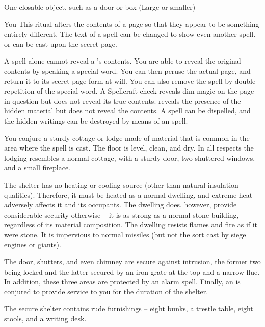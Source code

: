 \begin{spelltarget}{One closable object, such as a door or box (Large or smaller)}
\begin{spelltarget}{You}
\spelleffect This ritual alters the contents of a page so that they appear to be something entirely different. The text of a spell can be changed to show even another spell.  or  can be cast upon the secret page.
\par A  spell alone cannot reveal a 's contents. You are able to reveal the original contents by speaking a special word. You can then peruse the actual page, and return it to its secret page form at will. You can also remove the spell by double repetition of the special word.
\spellnotes A Spellcraft check reveals dim magic on the page in question but does not reveal its true contents.  reveals the presence of the hidden material but does not reveal the contents. A  spell can be dispelled, and the hidden writings can be destroyed by means of an  spell.

\spelldur{\durext \dismissable}
\spelleffect You conjure a sturdy cottage or lodge made of material that is common in the area where the spell is cast. The floor is level, clean, and dry. In all respects the lodging resembles a normal cottage, with a sturdy door, two shuttered windows, and a small fireplace.
\par The shelter has no heating or cooling source (other than natural insulation qualities). Therefore, it must be heated as a normal dwelling, and extreme heat adversely affects it and its occupants. The dwelling does, however, provide considerable security otherwise -- it is as strong as a normal stone building, regardless of its material composition. The dwelling resists flames and fire as if it were stone. It is impervious to normal missiles (but not the sort cast by siege engines or giants).
\par The door, shutters, and even chimney are secure against intrusion, the former two being locked and the latter secured by an iron grate at the top and a narrow flue. In addition, these three areas are protected by an alarm spell. Finally, an  is conjured to provide service to you for the duration of the shelter.
\par The secure shelter contains rude furnishings -- eight bunks, a trestle table, eight stools, and a writing desk.


\end{spelltarget}
\end{spelltarget}

